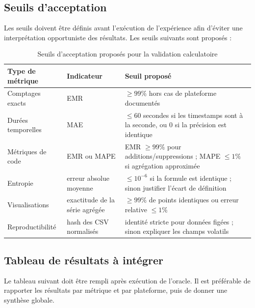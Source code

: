 \subsection{Seuils d'acceptation}
\label{subsec:seuils-acceptation}

Les seuils doivent être définis avant l'exécution de l'expérience afin d'éviter une interprétation opportuniste des résultats. Les seuils suivants sont proposés :

\begin{table}[H]
\centering
\small
\caption{Seuils d'acceptation proposés pour la validation calculatoire}
\label{tab:seuils-validation-calculatoire}
\begin{tabularx}{\textwidth}{|p{3.5cm}|X|X|}
\hline
\textbf{Type de métrique} & \textbf{Indicateur} & \textbf{Seuil proposé} \\
\hline
Comptages exacts & EMR & $\geq 99\%$ hors cas de plateforme documentés \\
\hline
Durées temporelles & MAE & $\leq 60$ secondes si les timestamps sont à la seconde, ou $0$ si la précision est identique \\
\hline
Métriques de code & EMR ou MAPE & EMR $\geq 99\%$ pour additions/suppressions ; MAPE $\leq 1\%$ si agrégation approximée \\
\hline
Entropie & erreur absolue moyenne & $\leq 10^{-6}$ si la formule est identique ; sinon justifier l'écart de définition \\
\hline
Visualisations & exactitude de la série agrégée & $\geq 99\%$ de points identiques ou erreur relative $\leq 1\%$ \\
\hline
Reproductibilité & hash des CSV normalisés & identité stricte pour données figées ; sinon expliquer les champs volatils \\
\hline
\end{tabularx}
\end{table}

\subsection{Tableau de résultats à intégrer}
\label{subsec:tableau-resultats-calculatoire}

Le tableau suivant doit être rempli après exécution de l'oracle. Il est préférable de rapporter les résultats par métrique et par plateforme, puis de donner une synthèse globale.

